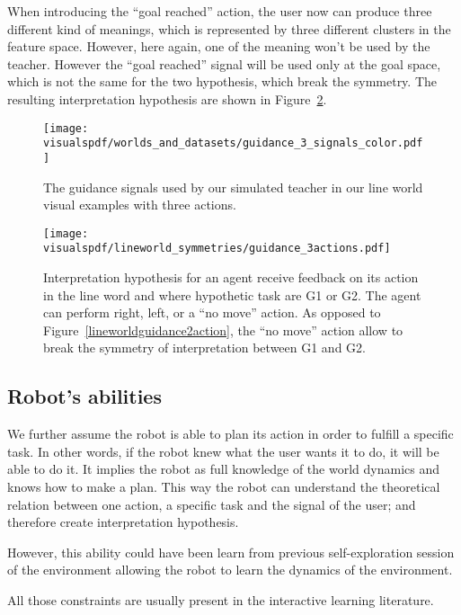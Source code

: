 When introducing the ``goal reached'' action, the user now can produce three different kind of meanings, which is represented by three different clusters in the feature space. However, here again, one of the meaning won't be used by the teacher. However the ``goal reached'' signal will be used only at the goal space, which is not the same for the two hypothesis, which break the symmetry. The resulting interpretation hypothesis are shown in Figure~\ref{fig:lineworldguidance3action}.

\begin{figure}[!ht]
  \centering
  \texttt{[image: \\visualspdf/worlds\_and\_datasets/guidance\_3\_signals\_color.pdf]}
  \caption{The guidance signals used by our simulated teacher in our line world visual examples with three actions.}
  \label{fig:lineworldguidance3signals}
\end{figure}

\begin{figure}[!ht]
  \centering
  \texttt{[image: \\visualspdf/lineworld\_symmetries/guidance\_3actions.pdf]}
  \caption{Interpretation hypothesis for an agent receive feedback on its action in the line word and where hypothetic task are G1 or G2. The agent can perform right, left, or a ``no move'' action. As opposed to Figure~\ref{lineworldguidance2action}, the ``no move'' action allow to break the symmetry of interpretation between G1 and G2.}
  \label{fig:lineworldguidance3action}
\end{figure}

\subsection{Robot's abilities}

We further assume the robot is able to plan its action in order to fulfill a specific task. In other words, if the robot knew what the user wants it to do, it will be able to do it. It implies the robot as full knowledge of the world dynamics and knows how to make a plan. This way the robot can understand the theoretical relation between one action, a specific task and the signal of the user; and therefore create interpretation hypothesis.

However, this ability could have been learn from previous self-exploration session of the environment allowing the robot to learn the dynamics of the environment.

\transition

All those constraints are usually present in the interactive learning literature. 

